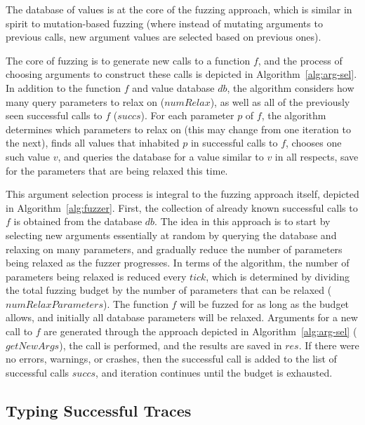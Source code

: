 \documentclass[sigplan,anonymous,review]{acmart}
\begin{document}
The database of values is at the core of the fuzzing approach, which is similar in spirit to mutation-based fuzzing (where instead of mutating arguments to previous calls, new argument values are selected based on previous ones).

The core of fuzzing is to generate new calls to a function $f$, and the process of choosing arguments to construct these calls is depicted in Algorithm~\ref{alg:arg-sel}.
In addition to the function $f$ and value database $db$, the algorithm considers how many query parameters to relax on ($numRelax$), as well as all of the previously seen successful calls to $f$ ($succs$).
For each parameter $p$ of $f$, the algorithm determines which parameters to relax on (this may change from one iteration to the next), finds all values that inhabited $p$ in successful calls to $f$, chooses one such value $v$, and queries the database for a value similar to $v$ in all respects, save for the parameters that are being relaxed this time.

This argument selection process is integral to the fuzzing approach itself, depicted in Algorithm~\ref{alg:fuzzer}.
First, the collection of already known successful calls to $f$ is obtained from the database $db$.
The idea in this approach is to start by selecting new arguments essentially at random by querying the database and relaxing on many parameters, and gradually reduce the number of parameters being relaxed as the fuzzer progresses.
In terms of the algorithm, the number of parameters being relaxed is reduced every $tick$, which is determined by dividing the total fuzzing budget by the number of parameters that can be relaxed ($numRelaxParameters$).
The function $f$ will be fuzzed for as long as the budget allows, and initially all database parameters will be relaxed.
Arguments for a new call to $f$ are generated through the approach depicted in Algorithm~\ref{alg:arg-sel} ($getNewArgs$), the call is performed, and the results are saved in $res$.
If there were no errors, warnings, or crashes, then the successful call is added to the list of successful calls $succs$, and iteration continues until the budget is exhausted.



\subsection{Typing Successful Traces}
\end{document}
